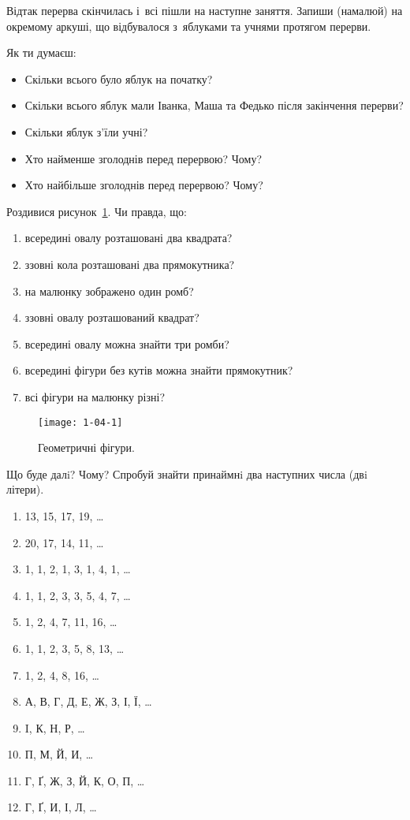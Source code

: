 Відтак перерва скінчилась і~всі пішли на наступне заняття.
Запиши (намалюй) на окремому аркуші, що відбувалося з~яблуками
та учнями протягом перерви.

Як ти думаєш:
\begin{itemize}
  \item Скільки всього було яблук на початку?
  \item Скільки всього яблук мали Іванка, Маша та Федько
  після закінчення перерви?
  \item Скільки яблук з'їли учні?
  \item Хто найменше зголоднів перед перервою? Чому?
  \item Хто найбільше зголоднів перед перервою? Чому?
\end{itemize}


\problem
Роздивися рисунок~\ref{fig:geom-figures}.
Чи правда, що:
\begin{enumerate}
  \item всередині овалу розташовані два квадрата?
  \item ззовні кола розташовані два прямокутника?
  \item на малюнку зображено один ромб?
  \item ззовні овалу розташований квадрат?
  \item всередині овалу можна знайти три ромби?
  \item всередині фігури без кутів можна знайти прямокутник?
  \item всі фігури на малюнку різні?
\end{enumerate}

\begin{figure}[ht]
  \centering
  \texttt{[image: 1-04-1]}
  \caption{Геометричні фігури.}
  \label{fig:geom-figures}
\end{figure}


\problem
Що буде далi? Чому?
Спробуй знайти принаймнi два наступних числа (двi літери).
\begin{enumerate}
  \item 13, 15, 17, 19, \ldots
  \item 20, 17, 14, 11, \ldots
  \item 1, 1, 2, 1, 3, 1, 4, 1, \ldots
  \item 1, 1, 2, 3, 3, 5, 4, 7, \ldots
  \item 1, 2, 4, 7, 11, 16, \ldots
  \item 1, 1, 2, 3, 5, 8, 13, \ldots
  \item 1, 2, 4, 8, 16, \ldots
  \item А, В, Г, Д, Е, Ж, З, І, Ї, \ldots
  \item I, К, Н, Р, \ldots
  \item П, М, Й, И, \ldots
  \item Г, Ґ, Ж, З, Й, К, О, П, \ldots
  \item Г, Ґ, И, І, Л, \ldots
\end{enumerate}


